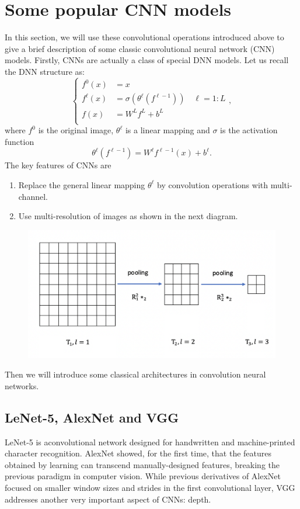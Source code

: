 \newpage
\section{Some popular CNN models}\label{sec:CNNs}
In this section, we will use these convolutional operations
introduced above to give a brief description of some classic convolutional
neural network (CNN) models.
Firstly, CNNs are actually a class of special DNN models. Let us recall the 
DNN structure as:
\begin{equation}
\begin{cases}
f^0(x) &= x \\
f^{\ell}(x) &=  \sigma(\theta^\ell (f^{\ell-1})) \quad \ell = 1:L \\
f(x) &= W^L f^{L} + b^L \\
\end{cases},
\end{equation}
where $f^0$ is the original image, $\theta^\ell$ is a linear mapping and $\sigma$ is the activation function
\begin{equation}
\theta^\ell (f^{\ell-1}) = W^\ell f^{\ell-1}(x)  + b^\ell.
\end{equation}
The key features of CNNs are
\begin{enumerate}
	\item Replace the general
linear mapping $\theta^\ell$ by convolution operations with multi-channel.
\item Use multi-resolution of images as shown in the next diagram.
\end{enumerate}
\begin{figure}[H]
	\centering
	\includegraphics[width=.85\textwidth]{figures/multiresolution-CNN}
\end{figure}

Then we will introduce some classical architectures in convolution neural 
networks.


\subsection{LeNet-5, AlexNet and VGG}
LeNet-5 \cite{lecun1998gradient} is aconvolutional network designed for handwritten and machine-printed character recognition.  AlexNet \cite{krizhevsky2012imagenet} showed, for the first time, that the features obtained by learning can transcend manually-designed features, breaking the previous paradigm in computer vision. While previous derivatives of AlexNet focused on smaller window sizes and strides in the first convolutional layer, VGG \cite{simonyan2014very} addresses another very important aspect of CNNs: depth.

